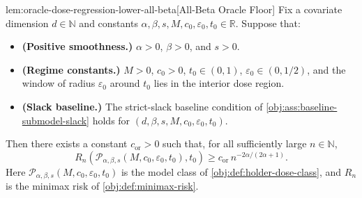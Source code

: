 \documentclass[11pt]{article}
\begin{document}
\begin{lemmav}{lem:oracle-dose-regression-lower-all-beta}[All-Beta Oracle Floor]
Fix a covariate dimension $d\in\mathbb N$ and constants
$\alpha,\beta,s,M,c_0,\varepsilon_0,t_0\in\mathbb R$. Suppose that:
\begin{itemize}
\item \textbf{(Positive smoothness.)} $\alpha>0$, $\beta>0$, and $s>0$.
\item \textbf{(Regime constants.)} $M>0$, $c_0>0$, $t_0\in(0,1)$, $\varepsilon_0\in(0,1/2)$, and the window of radius $\varepsilon_0$ around $t_0$ lies in the interior dose region.
\item \textbf{(Slack baseline.)} The strict-slack baseline condition of \cref{obj:ass:baseline-submodel-slack} holds for $(d,\beta,s,M,c_0,\varepsilon_0,t_0)$.
\end{itemize}
Then there exists a constant $c_{\mathrm{or}}>0$ such that, for all sufficiently large $n\in\mathbb N$,
\[
R_n\!\left(\mathcal P_{\alpha,\beta,s}(M,c_0,\varepsilon_0,t_0),t_0\right)
\ge
c_{\mathrm{or}}\, n^{-2\alpha/(2\alpha+1)} .
\]
Here $\mathcal P_{\alpha,\beta,s}(M,c_0,\varepsilon_0,t_0)$ is the model class of \cref{obj:def:holder-dose-class}, and $R_n$ is the minimax risk of \cref{obj:def:minimax-risk}.
\end{lemmav}
\end{document}
